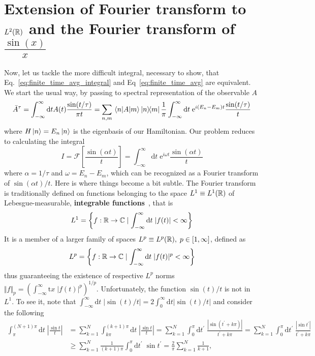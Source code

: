 \section{Extension of Fourier transform to \(L^2(\mathbb{R})\) and the Fourier transform of \(\frac{\sin(x)}{x}\)}
Now, let us tackle the more difficult integral, necessary to show, that Eq.~\eqref{eq:finite_time_avg_integral}
and Eq~\eqref{eq:finite_time_avg} are equivalent. We start the usual way, by passing to spectral representation
of the observable \(A\)
\begin{equation}
    \bar{A}^{\tau} = \int_{-\infty}^{\infty} \mathrm{d}t A(t) \frac{\sin (t/\tau )}{\pi t}
    = \sum_{n,m}  \matrixel{n}{A}{m} \ketbra{n}{m} \frac{1}{\pi } \int_{-\infty}^{\infty} \mathrm{d}t\;
    \mathrm{e}^{i (E_n-E_m) t} \frac{\sin (t/\tau )}{t}
\end{equation}
where \(H\ket{n} = E_n \ket{n}\) is the eigenbasis of our Hamiltonian. Our problem reduces to calculating
the integral
\begin{equation}
    I =\mathcal{F}\left[ \frac{\sin (\alpha t)}{t} \right]=  \int_{-\infty}^{\infty} \mathrm{d}t\; \mathrm{e}^{i \omega  t} \frac{\sin (\alpha  t )}{t}
\end{equation}
where \(\alpha = 1/\tau\) and \(\omega = E_n-E_m\), which can be recognized as a Fourier transform of
\(\sin (\alpha  t )/t\). Here is where things become a bit subtle. The Fourier transform is traditionally
defined on functions belonging to the space \(L^1 \equiv L^1(\mathbb{R})\) of Lebesgue-measurable, \textbf{integrable
    functions}~\autocite{Rudin1987}, that is
\begin{equation}
    L^1 = \left\{f:\mathbb{R} \to \mathbb{C} \mid \int_{-\infty}^{\infty} \mathrm{d}t \; |f(t)| < \infty \right\}
\end{equation}
It is a member of a larger family of spaces \(L^p \equiv L^p(\mathbb{R}),\; p \in \left[ 1,\infty  \right] \), defined as
\begin{equation}
    L^p = \left\{f:\mathbb{R} \to \mathbb{C} \mid \int_{-\infty}^{\infty} \mathrm{d}t \; |f(t)|^p < \infty \right\}
\end{equation}
thus guaranteeing the existence of respective \(L^p\) norms \(\Vert f \Vert_p = \left(\int_{-\infty}^{\infty} \mathrm{t}x \; |f(t)|^p \right)^{1/p}\).
Unfortunately, the function \(\sin (t)/t\) is not in \(L^1\). To see it, note that
\(\int_{-\infty}^{\infty} \mathrm{d}t\; \vert \sin (t)/t \vert = 2 \int_{0}^{\infty} \mathrm{d}t \vert \sin (t)/t \vert  \)
and consider the following
\begin{align*}
    \int_{\pi}^{(N+1)\pi}\mathrm{d}t\;  \left|\frac{\sin t}{t}\right| & =\sum_{k=1}^N\int_{k\pi}^{(k+1)\pi}\mathrm{d}t \;\left|\frac{\sin t}t\right|
    =\sum_{k=1}^N\int_0^{\pi}\mathrm{d}t^{\prime}  \;\frac{|\sin(t^{\prime} +k\pi)|}{t^{\prime} +k\pi}
    =\sum_{k=1}^N\int_0^{\pi}\mathrm{d}t^{\prime}  \;\frac{|\sin t^{\prime} |}{t^{\prime} +k\pi}                                                                                 \\\
                                                                    & \geq \sum_{k=1}^N\frac 1{(k+1)\pi}\int_0^{\pi}\mathrm{d}t^{\prime} \;  \sin t^{\prime} 
    =\frac 2{\pi}\sum_{k=1}^N\frac 1{k+1},
\end{align*}
